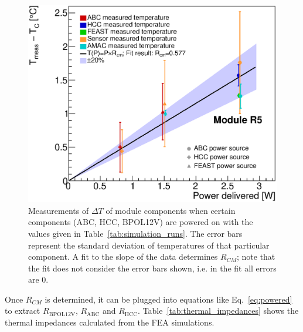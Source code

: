 \begin{figure}[ht!]
\includegraphics[width=0.49\linewidth]{figures/ThermalImpedanceFit_R5_Rcm.eps}
\caption{Measurements of $\Delta T$ of module components when certain components (ABC, HCC, BPOL12V)
are powered on with the values given in Table~\ref{tab:simulation_runs}. 
The error bars represent the standard deviation of temperatures of that particular
component. A fit to the slope of the data determines $R_{CM}$; note that the fit does not consider
the error bars shown, i.e. in the fit all errors are 0.
}
\label{rcm_fits}
\end{figure}

Once $R_{CM}$ is determined, it can be plugged into equations like Eq.~\ref{eq:powered} to extract
$R_\text{BPOL12V}$, $R_\text{ABC}$ and $R_\text{HCC}$.
Table~\ref{tab:thermal_impedances} shows the thermal impedances calculated
from the FEA simulations.

\def\insulabc{$(R\times n)_\text{ABC}$\xspace}
\def\insulhcc{$(R\times n)_\text{HCC}$\xspace}
\def\insulfeast{$(R\times n)_\text{BPOL12V}$\xspace}

